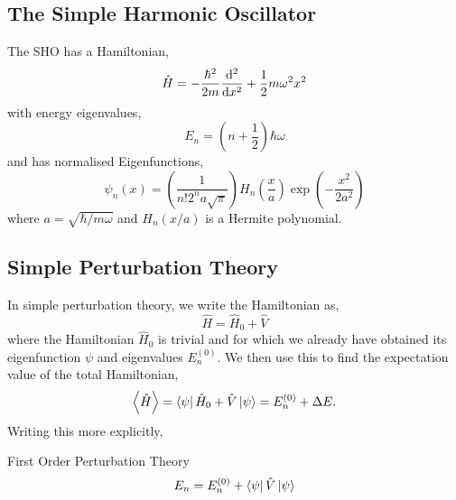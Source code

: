 \documentclass{book}
\begin{document}
\subsection{The Simple Harmonic Oscillator}
The SHO has a Hamiltonian,
\begin{equation}
	\hat{H} = - \frac{\hbar^2}{2m}\dv[2]{x} + \frac{1}{2}m\omega^2x^2
\end{equation}
with energy eigenvalues,
\begin{equation}
	E_n = \left(n + \frac{1}{2}\right)\hbar \omega \label{eq:1D SHO E}
\end{equation}
and has normalised Eigenfunctions,
\begin{equation}
	\psi_n(x) = \left(\frac{1}{n!2^na\sqrt{\pi}}\right)H_n\left(\frac{x}{a}\right)\exp\left(-\frac{x^2}{2a^2}\right)
\end{equation}
where $a = \sqrt{\hbar/m\omega}$ and $H_n(x/a)$ is a Hermite polynomial.
\subsection{Simple Perturbation Theory}
In simple perturbation theory, we write the Hamiltonian as,
\begin{equation}
	\hat{H} = \hat{H}_0 + \hat{V}
\end{equation}
where the Hamiltonian $\hat{H}_0$ is trivial and for which we already have obtained its eigenfunction $\psi$ and eigenvalues $E_n^{(0)}$. We then use this to find the expectation value of the total Hamiltonian,
\begin{equation}
	\left<\hat{H}\right> = \bra{\psi}\hat{H}_0 + \hat{V}\ket{\psi} = E_n^{(0)} + \Delta E.
\end{equation}
Writing this more explicitly,
\begin{Definitions}{First Order Perturbation Theory}{}
	\begin{equation}
		E_n = E_n^{(0)} + \bra{\psi}\hat{V}\ket{\psi}
	\end{equation}
\end{Definitions}
\end{document}
